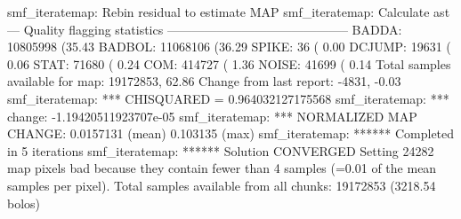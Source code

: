 \begin{terminalv}
smf_iteratemap: Rebin residual to estimate MAP
smf_iteratemap: Calculate ast
--- Quality flagging statistics --------------------------------------------
 BADDA:   10805998 (35.43%
BADBOL:   11068106 (36.29%
 SPIKE:         36 ( 0.00%
DCJUMP:      19631 ( 0.06%
  STAT:      71680 ( 0.24%
   COM:     414727 ( 1.36%
 NOISE:      41699 ( 0.14%
Total samples available for map:   19172853, 62.86%
     Change from last report:      -4831, -0.03%
smf_iteratemap: *** CHISQUARED = 0.964032127175568
smf_iteratemap: *** change: -1.19420511923707e-05
smf_iteratemap: *** NORMALIZED MAP CHANGE: 0.0157131 (mean) 0.103135 (max)
smf_iteratemap: ****** Completed in 5 iterations
smf_iteratemap: ****** Solution CONVERGED
Setting 24282 map pixels bad because they contain fewer than 4 samples (=0.01
of the mean samples per pixel).
Total samples available from all chunks: 19172853 (3218.54 bolos)

\end{terminalv}




